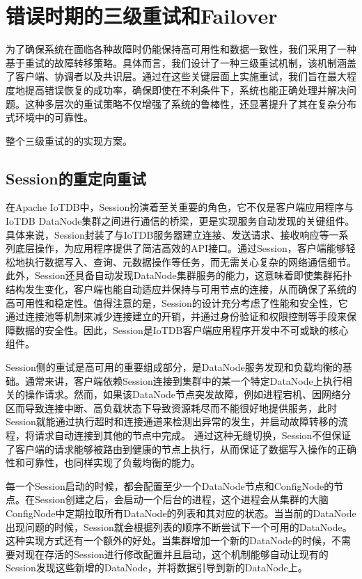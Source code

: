 \section{错误时期的三级重试和Failover}

为了确保系统在面临各种故障时仍能保持高可用性和数据一致性，我们采用了一种基于重试的故障转移策略。具体而言，我们设计了一种三级重试机制，该机制涵盖了客户端、协调者以及共识层。通过在这些关键层面上实施重试，我们旨在最大程度地提高错误恢复的成功率，确保即使在不利条件下，系统也能正确处理并解决问题。这种多层次的重试策略不仅增强了系统的鲁棒性，还显著提升了其在复杂分布式环境中的可靠性。

整个三级重试的的实现方案。

\subsection{Session的重定向重试}

在Apache IoTDB中，Session扮演着至关重要的角色，它不仅是客户端应用程序与IoTDB DataNode集群之间进行通信的桥梁，更是实现服务自动发现的关键组件。具体来说，Session封装了与IoTDB服务器建立连接、发送请求、接收响应等一系列底层操作，为应用程序提供了简洁高效的API接口。通过Session，客户端能够轻松地执行数据写入、查询、元数据操作等任务，而无需关心复杂的网络通信细节。此外，Session还具备自动发现DataNode集群服务的能力，这意味着即使集群拓扑结构发生变化，客户端也能自动适应并保持与可用节点的连接，从而确保了系统的高可用性和稳定性。值得注意的是，Session的设计充分考虑了性能和安全性，它通过连接池等机制来减少连接建立的开销，并通过身份验证和权限控制等手段来保障数据的安全性。因此，Session是IoTDB客户端应用程序开发中不可或缺的核心组件。

Session侧的重试是高可用的重要组成部分，是DataNode服务发现和负载均衡的基础。通常来讲，客户端依赖Session连接到集群中的某一个特定DataNode上执行相关的操作请求。然而，如果该DataNode节点突发故障，例如进程宕机、因网络分区而导致连接中断、高负载状态下导致资源耗尽而不能很好地提供服务，此时Session就能通过执行超时和连接通道来检测出异常的发生，并启动故障转移的流程，将请求自动连接到其他的节点中完成。
通过这种无缝切换，Session不但保证了客户端的请求能够被路由到健康的节点上执行，从而保证了数据写入操作的正确性和可靠性，也同样实现了负载均衡的能力。

每一个Session启动的时候，都会配置至少一个DataNode节点和ConfigNode的节点。在Session创建之后，会启动一个后台的进程，这个进程会从集群的大脑ConfigNode中定期拉取所有DataNode的列表和其对应的状态。当当前的DataNode出现问题的时候，Session就会根据列表的顺序不断尝试下一个可用的DataNode。这种实现方式还有一个额外的好处。当集群增加一个新的DataNode的时候，不需要对现在存活的Session进行修改配置并且启动，这个机制能够自动让现有的Session发现这些新增的DataNode，并将数据引导到新的DataNode上。

